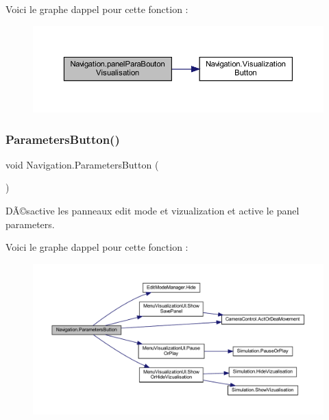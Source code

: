 Voici le graphe d\textquotesingle{}appel pour cette fonction \+:\nopagebreak
\begin{figure}[H]
\begin{center}
\leavevmode
\includegraphics[width=350pt]{class_navigation_a70f344f826956e694febdfb6fb693af4_cgraph}
\end{center}
\end{figure}
\mbox{\label{class_navigation_adf000d0931e06c79e1e66f266d93e313}} 
\subsubsection{\texorpdfstring{Parameters\+Button()}{ParametersButton()}}
{\footnotesize\ttfamily void Navigation.\+Parameters\+Button (\begin{DoxyParamCaption}{ }\end{DoxyParamCaption})\hspace{0.3cm}{\ttfamily [inline]}}



DÃ©sactive les panneaux edit mode et vizualization et active le panel parameters. 

Voici le graphe d\textquotesingle{}appel pour cette fonction \+:\nopagebreak
\begin{figure}[H]
\begin{center}
\leavevmode
\includegraphics[width=350pt]{class_navigation_adf000d0931e06c79e1e66f266d93e313_cgraph}
\end{center}
\end{figure}
\mbox{\label{class_navigation_ad4dbf103497aef10cc636c40f84dbdde}} 

